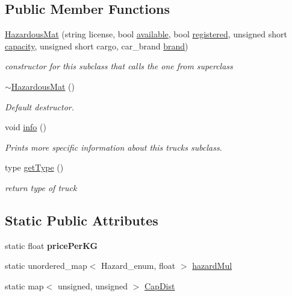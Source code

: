 \subsection*{Public Member Functions}
\begin{DoxyCompactItemize}
\item 
\hyperlink{class_hazardous_mat_a59551c520358aaae7ed899c2344af6a9}{Hazardous\+Mat} (string license, bool \hyperlink{class_truck_a4189fe5ed32f6084459a9c5ae1eb7c2a}{available}, bool \hyperlink{class_truck_a80b8405cf7a15b236fef70116f99c4fb}{registered}, unsigned short \hyperlink{class_truck_ab004524786ae7aebf7c7bdb5e1599696}{capacity}, unsigned short cargo, car\+\_\+brand \hyperlink{class_truck_a4e30b27a9898eba7ac8404d25cbdd265}{brand})
\begin{DoxyCompactList}\small\item\em constructor for this subclass that calls the one from superclass \end{DoxyCompactList}\item 
\hyperlink{class_hazardous_mat_aa4304419b08381d4aa46d240ca44738a}{$\sim$\+Hazardous\+Mat} ()
\begin{DoxyCompactList}\small\item\em Default destructor. \end{DoxyCompactList}\item 
void \hyperlink{class_hazardous_mat_ab07463da3e9a5d3b8933d2b01332ed00}{info} ()
\begin{DoxyCompactList}\small\item\em Prints more specific information about this truck\textquotesingle{}s subclass. \end{DoxyCompactList}\item 
type \hyperlink{class_hazardous_mat_aed587121cdff185be91ad9ec5ba4d380}{get\+Type} ()
\begin{DoxyCompactList}\small\item\em return type of truck \end{DoxyCompactList}\end{DoxyCompactItemize}
\subsection*{Static Public Attributes}
\begin{DoxyCompactItemize}
\item 
\mbox{\label{class_hazardous_mat_a9f71519edca3e72082720686781c34dc}} 
static float {\bfseries price\+Per\+KG}
\item 
static unordered\+\_\+map$<$ Hazard\+\_\+enum, float $>$ \hyperlink{class_hazardous_mat_a0d695364bed729ddeca5851314281ad2}{hazard\+Mul}
\item 
static map$<$ unsigned, unsigned $>$ \hyperlink{class_hazardous_mat_a5deebb5a87aa507f2a22065039a3dc2d}{Cap\+Dist}
\end{DoxyCompactItemize}
